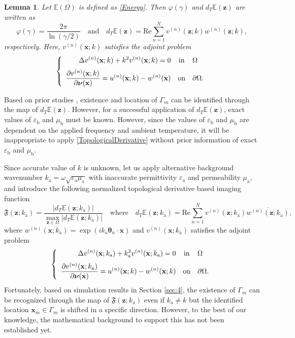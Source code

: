 \documentclass[a4,10pt]{article}
\newcommand{\ka}{k_{\mathrm{a}}}
\newcommand{\epsa}{\varepsilon_{\mathrm{a}}}
\newcommand{\epsb}{\varepsilon_{\mathrm{b}}}
\newcommand{\mub}{\mu_{\mathrm{b}}}
\newcommand{\mua}{\mu_{\mathrm{a}}}
\newcommand{\p}{\partial}
\newcommand{\mx}{\mathbf{x}}
\newcommand{\mz}{\mathbf{z}}
\newcommand{\vn}{\boldsymbol{\nu}}
\newcommand{\vt}{\boldsymbol{\theta}}
\theoremstyle{plain}
\newtheorem{lemma}{Lemma}[section]
\theoremstyle{remark}
\begin{document}
\begin{lemma}Let $\mathbb{E}(\Omega)$ is defined as \eqref{Energy}. Then $\varphi(\gamma)$ and $d_T\mathbb{E}(\mz)$ are written as
\begin{equation}\label{TopologicalDerivative}
\varphi(\gamma)=\frac{2\pi}{\ln(\gamma/2)}\quad\text{and}\quad d_T\mathbb{E}(\mz)=\mathrm{Re}\sum_{n=1}^{N}v^{(n)}(\mz;k)\overline{w^{(n)}(\mz;k)},
\end{equation}
respectively. Here, $v^{(n)}(\mx;k)$ satisfies the adjoint problem
\begin{equation}\label{Adjoint1}
\left\{\begin{array}{rcl}
\displaystyle\Delta v^{(n)}(\mx;k)+k^2v^{(n)}(\mx;k)=0&\mbox{in}&\Omega\\
\noalign{\medskip}\displaystyle\frac{\p v^{(n)}(\mx;k)}{\p\vn(\mx)}=u^{(n)}(\mx;k)-w^{(n)}(\mx)&\mbox{on}&\p\Omega.
  \end{array}\right.
\end{equation}
\end{lemma}

Based on prior studies \cite{AM2,B1,CPR,LR1,P-TD1,P-TD3,P-TD5}, existence and location of $\Gamma_m$ can be identified through the map of $d_T\mathbb{E}(\mz)$. However, for a successful application of $d_T\mathbb{E}(\mz)$, exact values of $\epsb$ and $\mub$ must be known. However, since the values of $\epsb$ and $\mub$ are dependent on the applied frequency and ambient temperature, it will be inappropriate to apply \eqref{TopologicalDerivative} without prior information of exact $\epsb$ and $\mub$.

Since accurate value of $k$ is unknown, let us apply alternative background wavenumber $\ka=\omega\sqrt{\epsa\mua}$ with inaccurate permittivity $\epsa$ and permeability $\mua$, and introduce the following normalized topological derivative based imaging function
\begin{equation}\label{NormalizedTopologicalDerivative}
  \mathfrak{F}(\mz;\ka)=\frac{|d_T\mathbb{E}(\mz;\ka)|}{\displaystyle\max_{\mz\in\Omega}|d_T\mathbb{E}(\mz;\ka)|}\quad\text{where}\quad d_T\mathbb{E}(\mz;\ka)=\mathrm{Re}\sum_{n=1}^{N}v^{(n)}(\mz;\ka)\overline{w^{(n)}(\mz;\ka)},
\end{equation}
where $w^{(n)}(\mx;\ka)=\exp(i\ka\vt_n\cdot\mx)$ and $v^{(n)}(\mx;\ka)$ satisfies the adjoint problem
\begin{equation}\label{Adjoint2}
  \left\{\begin{array}{rcl}
    \displaystyle\Delta v^{(n)}(\mx;\ka)+\ka^2 v^{(n)}(\mx;\ka)=0&\mbox{in}&\Omega\\
\noalign{\medskip}\displaystyle\frac{\p v^{(n)}(\mx;\ka)}{\p\vn(\mx)}=u^{(n)}(\mx;k)-w^{(n)}(\mx;k)&\mbox{on}&\p\Omega.
  \end{array}\right.
\end{equation}
Fortunately, based on simulation results in Section \ref{sec:4}, the existence of $\Gamma_m$ can be recognized through the map of $\mathfrak{F}(\mz;\ka)$ even if $\ka\ne k$ but the identified location $\mx_m\in\Gamma_m$ is shifted in a specific direction. However, to the best of our knowledge, the mathematical background to support this has not been established yet.
\end{document}
